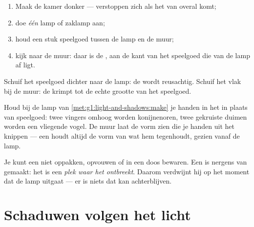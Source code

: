 \begin{method}\label{met:g1:light-and-shadows:make}
\begin{enumerate}
  \item Maak de kamer donker ---  verstoppen zich als het
         van overal komt;
  \item doe \emph{één} lamp of zaklamp aan;
  \item houd een stuk speelgoed tussen de lamp en de muur;
  \item kijk naar de muur: daar is de , aan de kant van het
        speelgoed die van de lamp af ligt.
\end{enumerate}
Schuif het speelgoed dichter naar de lamp: de  wordt reusachtig.
Schuif het vlak bij de muur: de  krimpt tot de echte grootte van
het speelgoed.
\end{method}

\begin{example}\label{ex:g1:light-and-shadows:animals}
Houd bij de lamp van \cref{met:g1:light-and-shadows:make} je handen in
het  in plaats van speelgoed: twee vingers omhoog worden
konijnenoren, twee gekruiste duimen worden een vliegende vogel. De
muur laat de vorm zien die je handen uit het  knippen --- een
 houdt altijd de vorm van wat hem tegenhoudt, gezien vanaf de
lamp.
\end{example}

\begin{remark}\label{rem:g1:light-and-shadows:notathing}
Je kunt een  niet oppakken, opvouwen of in een doos bewaren. Een
 is nergens van gemaakt: het is een \emph{plek waar het
 ontbreekt}. Daarom verdwijnt hij op het moment dat de lamp
uitgaat --- er is niets dat kan achterblijven.
\end{remark}

\section{Schaduwen volgen het licht}

